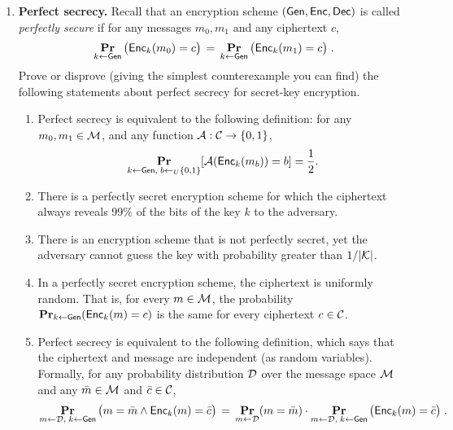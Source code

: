 \documentclass[12pt]{article}
\begin{document}
\begin{enumerate}
		

\item {\bf Perfect secrecy.}
Recall that an encryption scheme $ (\mathsf{Gen}, \mathsf{Enc}, \mathsf{Dec})$ is called \emph{perfectly secure} if for any messages $m_0,m_1$ and any ciphertext $c$, 
\[ \mathop{\bf Pr\/}_{k\gets \mathsf{Gen}}\big( \mathsf{Enc}_k(m_0)=c \big)\,=\, \mathop{\bf Pr\/}_{k\gets \mathsf{Gen}}\big( \mathsf{Enc}_k(m_1)=c \big)\;.\]
  Prove or disprove (giving the
  simplest counterexample you can find) the following statements about
  perfect secrecy for secret-key encryption. 
  \begin{enumerate}
\item Perfect secrecy is equivalent to the following
    definition:
  for any $m_{0}, m_{1} \in \mathcal{M}$, and any function
    $\mathcal{A} : \mathcal{C} \to \{0,1\}$,
    \[ \mathop{\bf Pr\/}_{k \gets \mathsf{Gen},\; b \gets_U \{0,1\}}[\mathcal{A}(\mathsf{Enc}_{k}(m_{b}))
    = b] = \frac{1}{2}. \]
    \item There is a perfectly secret encryption scheme for
    which the ciphertext always reveals 99\% of the bits of the key
    $k$ to the adversary.
\item There is an encryption scheme that is not perfectly secret, yet
    the adversary cannot guess the key with probability greater than $1/|\mathcal{K}|$.
\item In a perfectly secret encryption scheme, the
    ciphertext is uniformly random.  That is, for every $m \in
    \mathcal{M}$, the probability $\mathop{\bf Pr\/}_{k \gets \mathsf{Gen}}(\mathsf{Enc}_{k}(m)
    = {c})$ is the same for every ciphertext ${c} \in
    \mathcal{C}$.
\item Perfect secrecy is equivalent to the following
    definition, which says that the ciphertext and message are
    independent (as random variables).  Formally, for any probability
    distribution $\mathcal{D}$ over the message space $\mathcal{M}$ and any
    $\bar{m} \in \mathcal{M}$ and $\bar{c} \in \mathcal{C}$,
    \[ \mathop{\bf Pr\/}_{m \gets \mathcal{D},\; k \gets \mathsf{Gen}}\big( m = \bar{m} \wedge
    \mathsf{Enc}_{k}(m) = \bar{c}\big) \,=\, \mathop{\bf Pr\/}_{m \gets \mathcal{D}}(m = \bar{m})\cdot
    \mathop{\bf Pr\/}_{m \gets \mathcal{D},\; k \gets \mathsf{Gen}}\big(\mathsf{Enc}_{k}(m) =
    \bar{c}\big)\;. \]
  \end{enumerate}



\end{enumerate}
\end{document}

